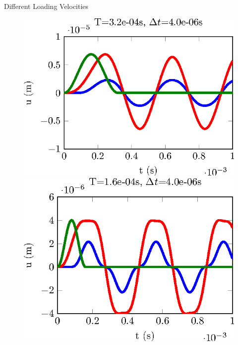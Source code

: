 \documentclass[12pt]{beamer}
\begin{document}
\begin{frame}{Different Loading Velocities} 
	\begin{figure}
		\begin{minipage}{0.24\linewidth}
			\includegraphics[width=1\linewidth]{CalculSchem3-T4-tikz.eps}
		\end{minipage}
		\begin{minipage}{0.24\linewidth}
			\includegraphics[width=1\linewidth]{CalculSchem3-T3-tikz.eps}
		\end{minipage}
		\begin{minipage}{0.24\linewidth}

\end{minipage}
\end{figure}
\end{frame}
\end{document}
